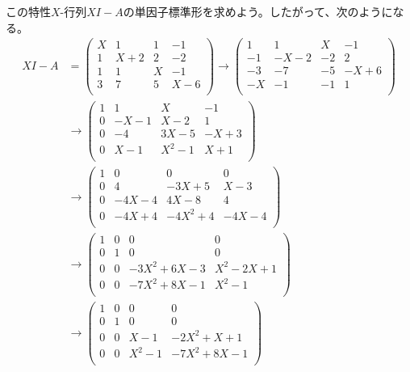 \documentclass[dvipdfmx]{jsarticle}
\begin{document}
この特性$X$-行列$XI - A$の単因子標準形を求めよう。したがって、次のようになる。
\begin{align*}
XI - A &= \begin{pmatrix}
X & 1 & 1 & - 1 \\
1 & X + 2 & 2 & - 2 \\
1 & 1 & X & - 1 \\
3 & 7 & 5 & X - 6 \\
\end{pmatrix} \rightarrow \begin{pmatrix}
1 & 1 & X & - 1 \\
 - 1 & - X - 2 & - 2 & 2 \\
 - 3 & - 7 & - 5 & - X + 6 \\
 - X & - 1 & - 1 & 1 \\
\end{pmatrix}\\
&\rightarrow \begin{pmatrix}
1 & 1 & X & - 1 \\
0 & - X - 1 & X - 2 & 1 \\
0 & - 4 & 3X - 5 & - X + 3 \\
0 & X - 1 & X^{2} - 1 & X + 1 \\
\end{pmatrix}\\
&\rightarrow \begin{pmatrix}
1 & 0 & 0 & 0 \\
0 & 4 & - 3X + 5 & X - 3 \\
0 & - 4X - 4 & 4X - 8 & 4 \\
0 & - 4X + 4 & - 4X^{2} + 4 & - 4X - 4 \\
\end{pmatrix}\\
&\rightarrow \begin{pmatrix}
1 & 0 & 0 & 0 \\
0 & 1 & 0 & 0 \\
0 & 0 & - 3X^{2} + 6X - 3 & X^{2} - 2X + 1 \\
0 & 0 & - 7X^{2} + 8X - 1 & X^{2} - 1 \\
\end{pmatrix}\\
&\rightarrow \begin{pmatrix}
1 & 0 & 0 & 0 \\
0 & 1 & 0 & 0 \\
0 & 0 & X - 1 & - 2X^{2} + X + 1 \\
0 & 0 & X^{2} - 1 & - 7X^{2} + 8X - 1 \\
\end{pmatrix}\\

\end{align*}
\end{document}
